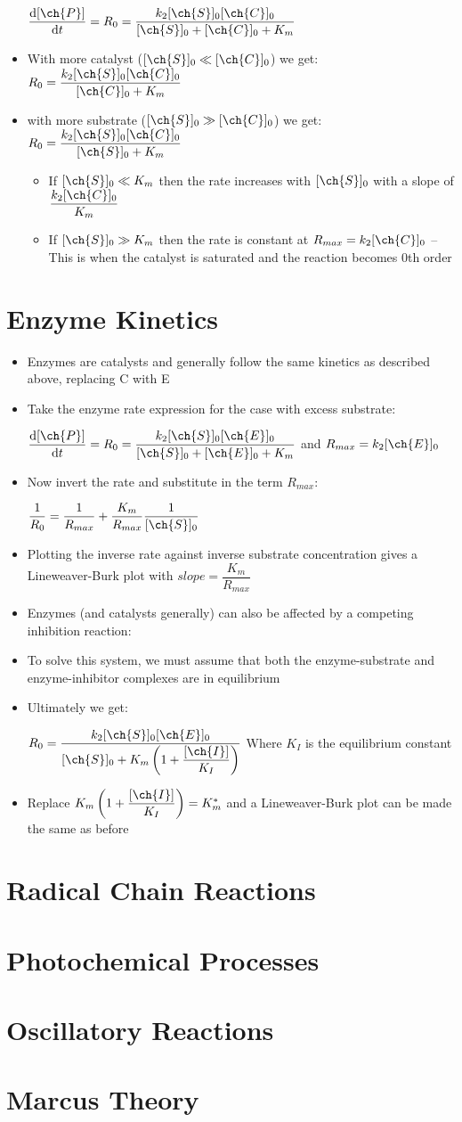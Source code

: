 \documentclass[12pt, openany, letterpaper]{memoir}
\begin{document}
\begin{itemize}
	$\dfrac{\mathrm{d}[\ch{P}]}{\mathrm{d}t} = R_0 = \dfrac{k_2[\ch{S}]_0[\ch{C}]_0}{[\ch{S}]_0+[\ch{C}]_0+K_m}$
	\item With more catalyst ($[\ch{S}]_0\ll[\ch{C}]_0$) we get: $R_0 = \dfrac{k_2[\ch{S}]_0[\ch{C}]_0}{[\ch{C}]_0+K_m}$
	\item with more substrate ($[\ch{S}]_0\gg[\ch{C}]_0$) we get: $R_0 = \dfrac{k_2[\ch{S}]_0[\ch{C}]_0}{[\ch{S}]_0+K_m}$
	\begin{itemize}
		\item If $[\ch{S}]_0\ll K_m$ then the rate increases with $[\ch{S}]_0$ with a slope of $\dfrac{k_2[\ch{C}]_0}{K_m}$
		\item If $[\ch{S}]_0\gg K_m$ then the rate is constant at $R_{max}=k_2[\ch{C}]_0$ -- This is when the catalyst is saturated and the reaction becomes 0th order
	\end{itemize}
\end{itemize}
\section*{Enzyme Kinetics}
\begin{itemize}
	\item Enzymes are catalysts and generally follow the same kinetics as described above, replacing C with E
	\item Take the enzyme rate expression for the case with excess substrate:
	
	$\dfrac{\mathrm{d}[\ch{P}]}{\mathrm{d}t} = R_0 = \dfrac{k_2[\ch{S}]_0[\ch{E}]_0}{[\ch{S}]_0+[\ch{E}]_0+K_m}$ and $R_{max}=k_2[\ch{E}]_0$
	\item Now invert the rate and substitute in the term $R_{max}$:
	
	$\dfrac{1}{R_0} = \dfrac{1}{R_{max}} + \dfrac{K_m}{R_{max}}\dfrac{1}{[\ch{S}]_0}$
	\item Plotting the inverse rate against inverse substrate concentration gives a Lineweaver-Burk plot with $slope = \dfrac{K_m}{R_{max}}$
	\item Enzymes (and catalysts generally) can also be affected by a competing inhibition reaction:
	
	\item To solve this system, we must assume that both the enzyme-substrate and enzyme-inhibitor complexes are in equilibrium
	\item Ultimately we get:
	
	$R_0 = \dfrac{k_2[\ch{S}]_0[\ch{E}]_0}{[\ch{S}]_0+K_m\left(1+\dfrac{[\ch{I}]}{K_I}\right)}$ Where $K_I$ is the equilibrium constant
	\item Replace $K_m\left(1+\dfrac{[\ch{I}]}{K_I}\right) = K_m^*$ and a Lineweaver-Burk plot can be made the same as before	
\end{itemize}
\section*{Radical Chain Reactions}
\section*{Photochemical Processes}
\section*{Oscillatory Reactions}
\section*{Marcus Theory}
\end{document}
